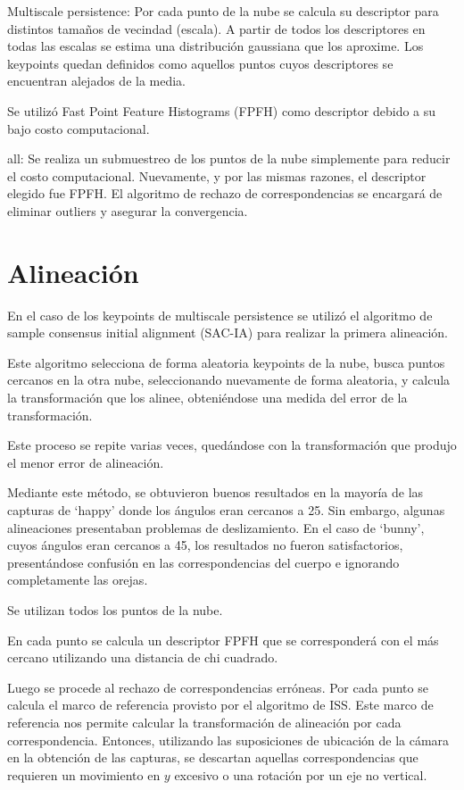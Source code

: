 		Multiscale persistence:
		Por cada punto de la nube se calcula su descriptor para distintos tamaños de vecindad (escala).
		A partir de todos los descriptores en todas las escalas se estima una distribución gaussiana que los aproxime.
		Los keypoints quedan definidos como aquellos puntos cuyos descriptores se encuentran alejados de la media.

		Se utilizó Fast Point Feature Histograms (FPFH) como descriptor debido a su bajo costo computacional.

		all:
		Se realiza un submuestreo de los puntos de la nube simplemente para
		reducir el costo computacional.
		Nuevamente, y por las mismas razones, el descriptor elegido fue FPFH.
		El algoritmo de rechazo de correspondencias se encargará de eliminar outliers y asegurar la convergencia.

	\section{Alineación}
	En el caso de los keypoints de multiscale persistence se utilizó el
	algoritmo de sample consensus initial alignment (SAC-IA) para realizar la
	primera alineación.

	Este algoritmo selecciona de forma aleatoria keypoints de la nube, busca
	puntos cercanos en la otra nube, seleccionando nuevamente de forma
	aleatoria, y calcula la transformación que los alinee, obteniéndose una
	medida del error de la transformación.

	Este proceso se repite varias veces, quedándose con la transformación que
	produjo el menor error de alineación.

	Mediante este método, se obtuvieron buenos resultados en la mayoría de las
	capturas de `happy' %
	donde los ángulos eran cercanos a 25. %
	Sin embargo, algunas alineaciones presentaban problemas de deslizamiento.
	En el caso de `bunny', cuyos ángulos eran cercanos a 45, %
	los resultados no fueron satisfactorios, presentándose confusión en las
	correspondencias del cuerpo e ignorando completamente las orejas.


	Se utilizan todos los puntos de la nube.

	En cada punto se calcula un descriptor FPFH que se corresponderá con el más
	cercano utilizando una distancia de chi cuadrado.

	Luego se procede al rechazo de correspondencias erróneas.
	Por cada punto se calcula el marco de referencia provisto por el algoritmo de ISS. %
	Este marco de referencia nos permite calcular la transformación de
	alineación por cada correspondencia.
	Entonces, utilizando las suposiciones de ubicación de la cámara en la
	obtención de las capturas, se descartan aquellas correspondencias que
	requieren un movimiento en $y$ excesivo o una rotación por un eje no
	vertical. 


